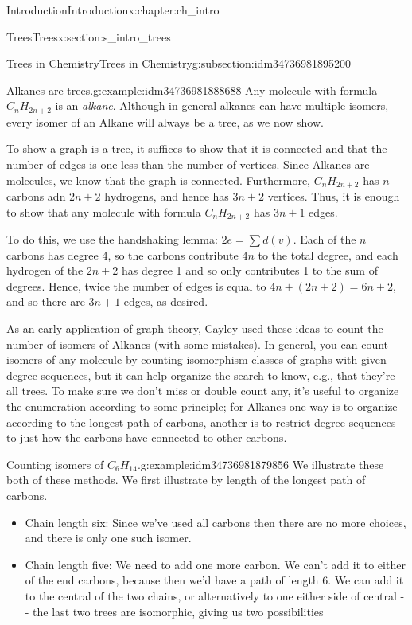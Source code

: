 \documentclass[oneside,10pt,]{book}
\numberwithin{equation}{section}
\begin{document}
\begin{chapterptx}{Introduction}{}{Introduction}{}{}{x:chapter:ch_intro}
\begin{sectionptx}{Trees}{}{Trees}{}{}{x:section:s_intro_trees}
\begin{subsectionptx}{Trees in Chemistry}{}{Trees in Chemistry}{}{}{g:subsection:idm34736981895200}
\begin{example}{Alkanes are trees.}{g:example:idm34736981888688}%
Any molecule with formula \(C_nH_{2n+2}\) is an \emph{alkane}.  Although in general alkanes can have multiple isomers, every isomer of an Alkane will always be a tree, as we now show.%
\par
To show a graph is a tree, it suffices to show that it is connected and that the number of edges is one less than the number of vertices.  Since Alkanes are molecules, we know that the graph is connected.  Furthermore, \(C_nH_{2n+2}\) has \(n\) carbons adn \(2n+2\) hydrogens, and hence has \(3n+2\) vertices.  Thus, it is enough to show that any molecule with formula \(C_nH_{2n+2}\) has \(3n+1\) edges.%
\par
To do this, we use the handshaking lemma: \(2e=\sum d(v)\).  Each of the \(n\) carbons has degree 4, so the carbons contribute \(4n\) to the total degree, and each hydrogen of the \(2n+2\) has degree 1 and so only contributes 1 to the sum of degrees.  Hence, twice the number of edges is equal to \(4n+(2n+2)=6n+2\), and so there are \(3n+1\) edges, as desired.%
\end{example}
As an early application of graph theory, Cayley used these ideas to count the number of isomers of Alkanes (with some mistakes).  In general, you can count isomers of any molecule by counting isomorphism classes of graphs with given degree sequences, but it can help organize the search to know, e.g., that they're all trees.  To make sure we don't miss or double count any, it's useful to organize the enumeration according to some principle; for Alkanes one way is to organize according to the longest path of carbons, another is to restrict degree sequences to just how the carbons have connected to other carbons.%
\begin{example}{Counting isomers of \(C_6H_{14}\).}{g:example:idm34736981879856}%
We illustrate these both of these methods.  We first illustrate by length of the longest path of carbons.%
%
\begin{itemize}[label=\textbullet]
\item{}Chain length six: Since we've used all carbons then there are no more choices, and there is only one such isomer.%
\item{}Chain length five: We need to add one more carbon.  We can't add it to either of the end carbons, because then we'd have a path of length 6.  We can add it to the central of the two chains, or alternatively to one either side of central -{}-{} the last two trees are isomorphic, giving us two possibilities%

\end{itemize}
\end{example}
\end{subsectionptx}
\end{sectionptx}
\end{chapterptx}
\end{document}
